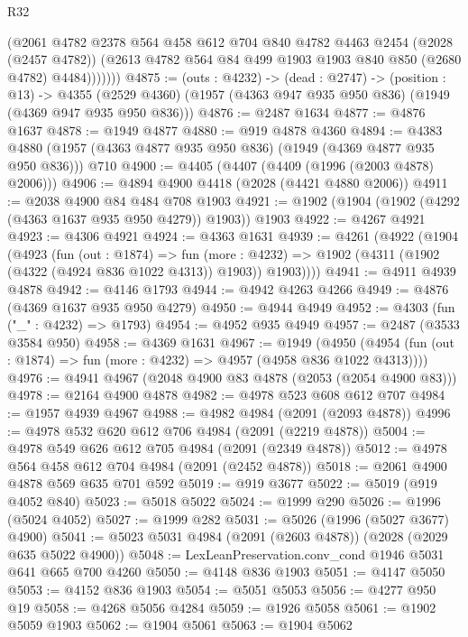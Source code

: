 \begin{lexlean}{R32}
\begin{coremodule}
              (@2061
                @4782
                @2378
                @564
                @458
                @612
                @704
                @840
                @4782
                @4463
                @2454
                (@2028 (@2457 @4782))
                (@2613 @4782 @564 @84 @499 @1903 @1903 @840 @850 (@2680 @4782) @4484)))))))
@4875 := (outs : @4232) ->
  (dead : @2747) ->
  (position : @13) ->
  @4355 (@2529 @4360) (@1957 (@4363 @947 @935 @950 @836) (@1949 (@4369 @947 @935 @950 @836)))
@4876 := @2487 @1634
@4877 := @4876 @1637
@4878 := @1949 @4877
@4880 := @919 @4878 @4360
@4894 := @4383 @4880 (@1957 (@4363 @4877 @935 @950 @836) (@1949 (@4369 @4877 @935 @950 @836))) @710
@4900 := @4405 (@4407 (@4409 (@1996 (@2003 @4878) @2006)))
@4906 := @4894 @4900 @4418 (@2028 (@4421 @4880 @2006))
@4911 := @2038 @4900 @84 @484 @708 @1903
@4921 := @1902 (@1904 (@1902 (@4292 (@4363 @1637 @935 @950 @4279)) @1903)) @1903
@4922 := @4267 @4921
@4923 := @4306 @4921
@4924 := @4363 @1631
@4939 := @4261
    (@4922
      (@1904
        (@4923
          (fun (out : @1874) =>
          fun (more : @4232) =>
          @1902 (@4311 (@1902 (@4322 (@4924 @836 @1022 @4313)) @1903)) @1903))))
@4941 := @4911 @4939 @4878
@4942 := @4146 @1793
@4944 := @4942 @4263 @4266
@4949 := @4876 (@4369 @1637 @935 @950 @4279)
@4950 := @4944 @4949
@4952 := @4303 (fun ("_" : @4232) => @1793)
@4954 := @4952 @935 @4949
@4957 := @2487 (@3533 @3584 @950)
@4958 := @4369 @1631
@4967 := @1949
    (@4950 (@4954 (fun (out : @1874) => fun (more : @4232) => @4957 (@4958 @836 @1022 @4313))))
@4976 := @4941 @4967 (@2048 @4900 @83 @4878 (@2053 (@2054 @4900 @83)))
@4978 := @2164 @4900 @4878
@4982 := @4978 @523 @608 @612 @707
@4984 := @1957 @4939 @4967
@4988 := @4982 @4984 (@2091 (@2093 @4878))
@4996 := @4978 @532 @620 @612 @706 @4984 (@2091 (@2219 @4878))
@5004 := @4978 @549 @626 @612 @705 @4984 (@2091 (@2349 @4878))
@5012 := @4978 @564 @458 @612 @704 @4984 (@2091 (@2452 @4878))
@5018 := @2061 @4900 @4878 @569 @635 @701 @592
@5019 := @919 @3677
@5022 := @5019 (@919 @4052 @840)
@5023 := @5018 @5022
@5024 := @1999 @290
@5026 := @1996 (@5024 @4052)
@5027 := @1999 @282
@5031 := @5026 (@1996 (@5027 @3677) @4900)
@5041 := @5023 @5031 @4984 (@2091 (@2603 @4878)) (@2028 (@2029 @635 @5022 @4900))
@5048 := LexLeanPreservation.conv_cond @1946 @5031 @641 @665 @700 @4260
@5050 := @4148 @836 @1903
@5051 := @4147 @5050
@5053 := @4152 @836 @1903
@5054 := @5051 @5053
@5056 := @4277 @950 @19
@5058 := @4268 @5056 @4284
@5059 := @1926 @5058
@5061 := @1902 @5059 @1903
@5062 := @1904 @5061
@5063 := @1904 @5062

\end{coremodule}
\end{lexlean}

